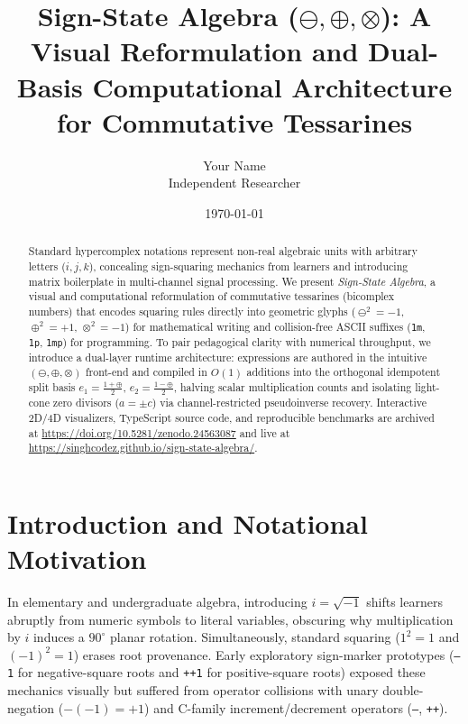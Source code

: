 \documentclass[11pt,a4paper]{article}
\title{\textbf{Sign-State Algebra ($\ominus, \oplus, \otimes$): A Visual Reformulation and Dual-Basis Computational Architecture for Commutative Tessarines}}
\author{Your Name \\ \small Independent Researcher}
\date{\today}
\begin{document}
\maketitle

\begin{abstract}
Standard hypercomplex notations represent non-real algebraic units with arbitrary letters ($i, j, k$), concealing sign-squaring mechanics from learners and introducing matrix boilerplate in multi-channel signal processing. We present \emph{Sign-State Algebra}, a visual and computational reformulation of commutative tessarines (bicomplex numbers) that encodes squaring rules directly into geometric glyphs ($\ominus^2 = -1$, $\oplus^2 = +1$, $\otimes^2 = -1$) for mathematical writing and collision-free ASCII suffixes (\texttt{1m}, \texttt{1p}, \texttt{1mp}) for programming. To pair pedagogical clarity with numerical throughput, we introduce a dual-layer runtime architecture: expressions are authored in the intuitive $(\ominus, \oplus, \otimes)$ front-end and compiled in $O(1)$ additions into the orthogonal idempotent split basis $e_1 = \frac{1+\oplus}{2}$, $e_2 = \frac{1-\oplus}{2}$, halving scalar multiplication counts and isolating light-cone zero divisors ($a = \pm c$) via channel-restricted pseudoinverse recovery. Interactive 2D/4D visualizers, TypeScript source code, and reproducible benchmarks are archived at \url{https://doi.org/10.5281/zenodo.24563087} and live at \url{https://singhcodez.github.io/sign-state-algebra/}.

\end{abstract}

\section{Introduction and Notational Motivation}
In elementary and undergraduate algebra, introducing $i = \sqrt{-1}$ shifts learners abruptly from numeric symbols to literal variables, obscuring why multiplication by $i$ induces a $90^\circ$ planar rotation. Simultaneously, standard squaring ($1^2 = 1$ and $(-1)^2 = 1$) erases root provenance. Early exploratory sign-marker prototypes (\texttt{--1} for negative-square roots and \texttt{++1} for positive-square roots) exposed these mechanics visually but suffered from operator collisions with unary double-negation ($-(-1) = +1$) and C-family increment/decrement operators (\texttt{--}, \texttt{++}).
\end{document}
